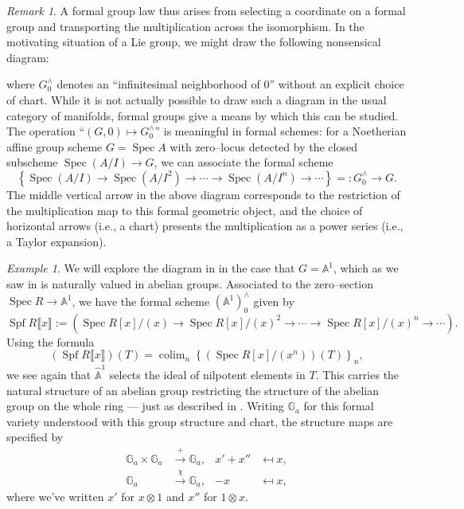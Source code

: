 \documentclass{amsart}
\newcommand{\G}{\mathbb G}
\newcommand{\A}{\widehat{\mathbb{A}}}
\newcommand{\<}{\langle}
\renewcommand{\>}{\rangle}
\DeclareMathOperator{\Spec}{Spec}
\DeclareMathOperator{\Spf}{Spf}
\DeclareMathOperator{\colim}{colim}
\theoremstyle{plain}
\theoremstyle{definition}
\theoremstyle{remark}
\newtheorem*{remark}{Remark}
\newtheorem*{example}{Example}
\begin{document}
\begin{remark}\label{LieGpIntuition}
A formal group law thus arises from selecting a coordinate on a formal group and transporting the multiplication across the isomorphism.  In the motivating situation of a Lie group, we might draw the following nonsensical diagram:
\begin{center}
\end{center}
where $G^\wedge_0$ denotes an ``infinitesimal neighborhood of $0$'' without an explicit choice of chart.  While it is not actually possible to draw such a diagram in the usual category of manifolds, formal groups give a means by which this can be studied.  The operation ``$(G, 0) \mapsto G^\wedge_0$'' is meaningful in formal schemes: for a Noetherian affine group scheme $G = \Spec A$ with zero--locus detected by the closed subscheme $\Spec (A/I) \to G$, we can associate the formal scheme \[\left\{ \Spec(A/I) \to \Spec(A/I^2) \to \cdots \to \Spec(A/I^n) \to \cdots \right\} =: G^\wedge_0 \to G.\]  The middle vertical arrow in the above diagram corresponds to the restriction of the multiplication map to this formal geometric object, and the choice of horizontal arrows (i.e., a chart) presents the multiplication as a power series (i.e., a Taylor expansion).
\end{remark}

\begin{example}\label{FormalGaExample}
We will explore the diagram in  in the case that $G = \mathbb A^1$, which as we saw in  is naturally valued in abelian groups.  Associated to the zero--section $\Spec R \to \mathbb A^1$, we have the formal scheme $(\mathbb A^1)^\wedge_0$ given by \[\Spf R\llbracket x \rrbracket := \left(\Spec R[x] / (x) \to \Spec R[x] / (x)^2 \to \cdots \to \Spec R[x] / (x)^n \to \cdots\right).\]  Using the formula \[(\Spf R\llbracket x \rrbracket)(T) = \colim_n \left\{(\Spec R[x]/(x^n))(T)\right\}_n,\] we see again that $\A^1$ selects the ideal of nilpotent elements in $T$.  This carries the natural structure of an abelian group restricting the structure of the abelian group on the whole ring --- just as described in .  Writing $\G_a$ for this formal variety understood with this group structure and chart, the structure maps are specified by
\begin{align*}
\G_a \times \G_a & \xrightarrow{+} \G_a, & x' + x'' & \mapsfrom x, \\
\G_a & \xrightarrow{\chi} \G_a, & -x & \mapsfrom x,
\end{align*}
where we've written $x'$ for $x \otimes 1$ and $x''$ for $1 \otimes x$.
\end{example}
\end{document}
